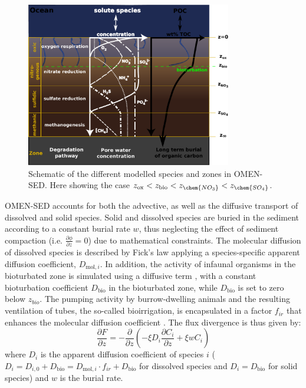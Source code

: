 \documentclass[gmd, manuscript]{copernicus}
\begin{document}
\begin{figure}[htbp]
\begin{center}
	\includegraphics[width=0.8\textwidth]{figures/Sediment-model-with-profiles.pdf}
	\caption{Schematic of the different modelled species and zones in OMEN-SED. Here showing the case $z_{\mathrm{ox}} < z_{\mathrm{bio}} < z_{\chem{NO_3}} < z_{\chem{SO_4}}$.}
	\label{fig:Sediment_layers}
	\end{center}
\end{figure}

OMEN-SED accounts for both the advective, as well as the diffusive transport of dissolved and solid species. Solid and dissolved species are buried in the sediment according to a constant burial rate $w$, thus 
neglecting the effect of sediment compaction (i.e. $\frac{\partial \phi}{\partial z}=0$) due to mathematical constraints. 
The molecular diffusion of dissolved species is described by Fick's law applying a species-specific apparent diffusion coefficient, $D_{\mathrm{mol},i}$.  In addition, the activity of infaunal organisms in the bioturbated zone 
is simulated using a diffusive term \citep[e.g.][]{boudreau_mathematics_1986}, with a constant bioturbation coefficient $D_{\mathrm{bio}}$ in the bioturbated zone, while $D_{\mathrm{bio}}$ is set to zero below $z_{bio}$. 
The pumping activity by burrow-dwelling animals and the resulting ventilation of tubes, the so-called bioirrigation, is encapsulated in a factor $f_{ir}$ that enhances the molecular diffusion coefficient 
\citep[hence, $D_{i,0}=D_{\mathrm{mol},i}\cdot f_{ir}$,][]{soetaert1996dynamic}. The flux divergence is thus given by:
\begin{equation}
\frac{\partial F}{\partial z}=-\frac{\partial}{\partial z}\left( -\xi D_i \frac{\partial C_i}{\partial z} +\xi w C_i\right) \label{Eq_flux_divergence}
\end{equation}
where $D_i$ is the apparent diffusion coefficient of species $i$ ($D_i=D_{i,0}+D_{\mathrm{bio}}=D_{\mathrm{mol},i}\cdot f_{ir}+D_{\mathrm{bio}}$ for dissolved species and $D_i=D_{\mathrm{bio}}$ for solid species) and $w$ is the 
burial rate.
\end{document}
